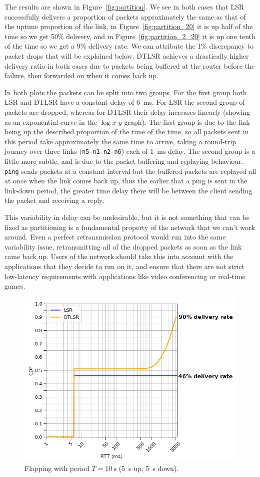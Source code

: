 \documentclass[withindex,glossary,openany]{cam-thesis}
\begin{document}
The results are shown in Figure~\ref{fig:partition}. We see in both cases that LSR successfully delivers a proportion of packets approximately the same as that of the uptime proportion of the link, in Figure~\ref{fig:partition_20} it is up half of the time so we get 50\% delivery, and in Figure~\ref{fig:partition_2_20} it is up one tenth of the time so we get a 9\% delivery rate. We can attribute the 1\% discrepancy to packet drops that will be explained below. DTLSR achieves a drastically higher delivery ratio in both cases due to packets being buffered at the router before the failure, then forwarded on when it comes back up.

In both plots the packets can be split into two groups. For the first group both LSR and DTLSR have a constant delay of \SI{6}{\ms}. For LSR the second group of packets are dropped, whereas for DTLSR their delay increases linearly (showing as an exponential curve in the $\log x$-$y$ graph). The first group is due to the link being up the described proportion of the time of the time, so all packets sent in this period take approximately the same time to arrive, taking a round-trip journey over three links (\texttt{n5-n1-n2-n6}) each of \SI{1}{\ms} delay. The second group is a little more subtle, and is due to the packet buffering and replaying behaviour. \texttt{ping} sends packets at a constant interval but the buffered packets are replayed all at once when the link comes back up, thus the earlier that a ping is sent in the link-down period, the greater time delay there will be between the client sending the packet and receiving a reply.

This variability in delay can be undesirable, but it is not something that can be fixed as partitioning is a fundamental property of the network that we can't work around. Even a perfect retransmission protocol would run into the same variability issue, retransmitting all of the dropped packets as soon as the link came back up. Users of the network should take this into account with the applications that they decide to run on it, and ensure that there are not strict low-latency requirements with applications like video conferencing or real-time games.

\begin{figure}
  \centering
  \includegraphics[width=0.8\linewidth]{delay_partition_flap5}
  \caption{Flapping with period $T=\SI{10}{\s}$ (\SI{5}{\s} up, \SI{5}{\s} down).}
  \label{fig:partition_5}
\end{figure}
\end{document}

